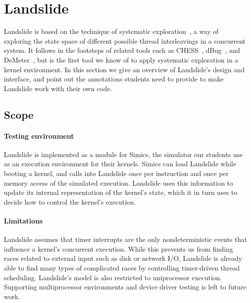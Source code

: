 \newcommand\hilight[2]{\color{#1}#2\color{black}}

\section{Landslide}
\label{sec:landslide}

Landslide is based on the technique of systematic exploration~\cite{verisoft}, a way of exploring the state space of different possible thread interleavings in a concurrent system.
It follows in the footsteps of related tools such as CHESS~\cite{chess}, dBug~\cite{dbug-ssv}, and DeMeter~\cite{demeter}, but is the first tool we know of to apply systematic exploration in a kernel environment.
In this section we give an overview of Landslide's design and interface, and point out the annotations students need to provide to make Landslide work with their own code.

\subsection{Scope}

\paragraph{Testing environment}
Landslide is implemented as a module for Simics, the simulator our students use as an execution environment for their kernels. Simics can load Landslide while booting a kernel, and calls into Landslide once per instruction and once per memory access of the simulated execution.
Landslide uses this information to update its internal representation of the kernel's state, which it in turn uses to decide how to control the kernel's execution.

\paragraph{Limitations}
Landslide assumes that timer interrupts are the only nondeterministic events that influence a kernel's concurrent execution. While this prevents us from finding races related to external input such as disk or network I/O, Landslide is already able to find many types of complicated races by controlling timer-driven thread scheduling.
Landslide's model is also restricted to uniprocessor execution.
Supporting multiprocessor environments and device driver testing is left to future work.

